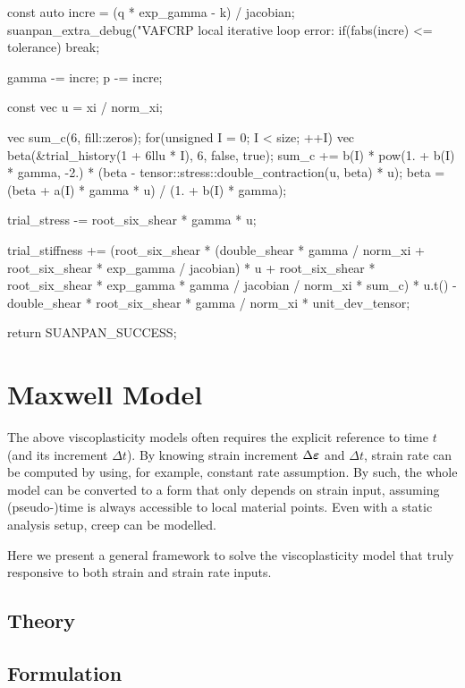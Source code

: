 \begin{cppcode}
{{        const auto incre = (q * exp_gamma - k) / jacobian;
        suanpan_extra_debug("VAFCRP local iterative loop error: %
        if(fabs(incre) <= tolerance) break;

        gamma -= incre;
        p -= incre;
    }

    const vec u = xi / norm_xi;

    vec sum_c(6, fill::zeros);
    for(unsigned I = 0; I < size; ++I) {
        vec beta(&trial_history(1 + 6llu * I), 6, false, true);
        sum_c += b(I) * pow(1. + b(I) * gamma, -2.) * (beta - tensor::stress::double_contraction(u, beta) * u);
        beta = (beta + a(I) * gamma * u) / (1. + b(I) * gamma);
    }

    trial_stress -= root_six_shear * gamma * u;

    trial_stiffness += (root_six_shear * (double_shear * gamma / norm_xi + root_six_shear * exp_gamma / jacobian) * u + root_six_shear * root_six_shear * exp_gamma * gamma / jacobian / norm_xi * sum_c) * u.t() - double_shear * root_six_shear * gamma / norm_xi * unit_dev_tensor;

    return SUANPAN_SUCCESS;
}
\end{cppcode}
\section{Maxwell Model}
The above viscoplasticity models often requires the explicit reference to time $t$ (and its increment $\Delta{}t$). By knowing strain increment $\Delta{}\bm{\varepsilon}$ and $\Delta{}t$, strain rate can be computed by using, for example, constant rate assumption. By such, the whole model can be converted to a form that only depends on strain input, assuming (pseudo-)time is always accessible to local material points. Even with a static analysis setup, creep can be modelled.

Here we present a general framework to solve the viscoplasticity model that truly responsive to both strain and strain rate inputs.
\subsection{Theory}
\subsection{Formulation}
